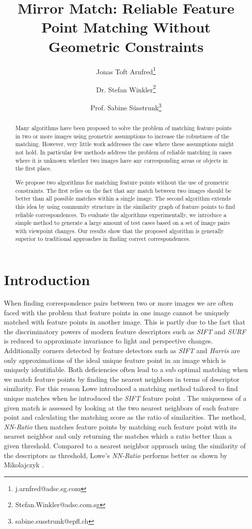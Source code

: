 \documentclass[conference]{IEEEtran}
\title{Mirror Match: Reliable Feature Point Matching Without Geometric 
Constraints}
\author[1,2]{Jonas Toft Arnfred\thanks{j.arnfred@adsc.sg.com}}
\author[1]{Dr. Stefan Winkler\thanks{Stefan.Winkler@adsc.com.sg}}
\author[2]{Prof. Sabine S\"usstrunk\thanks{sabine.susstrunk@epfl.ch}}
\affil[1]{Advanced Digital Science Center, Singapore}
\affil[2]{\'Ecole Polytechnique F\'ed\'erale de Lausanne}
\begin{document}
\maketitle
%
\begin{abstract}
Many algorithms have been proposed to solve the problem of matching 
feature points in two or more images using geometric assumptions to 
increase the robustness of the matching. However, very little work 
addresses the case where these assumptions might not hold. In particular 
few methods address the problem of reliable matching in cases where it 
is unknown whether two images have any corresponding areas or objects in 
the first place. 

We propose two algorithms for matching feature points without the use of 
geometric constraints. The first relies on the fact that any match 
between two images should be better than all possible matches within a 
single image. The second algorithm extends this idea by using community 
structure in the similarity graph of feature points to find reliable 
correspondences. To evaluate the algorithms experimentally, we introduce 
a simple method to generate a large amount of test cases based on a set 
of image pairs with viewpoint changes. Our results show that the 
proposed algorithm is generally superior to traditional approaches in 
finding correct correspondences.
\end{abstract}
%
\section{Introduction}
%
When finding correspondence pairs between two or more images we are 
often faced with the problem that feature points in one image cannot be 
uniquely matched with feature points in another image. This is partly 
due to the fact that the discriminatory powers of modern feature 
descriptors such as \emph{SIFT} \cite{lowe2004sift} and \emph{SURF} 
\cite{bay2006surf} is reduced to approximate invariance to light and 
perspective changes.  Additionally corners detected by feature detectors 
such as \emph{SIFT} and \emph{Harris} \cite{harris1988combined} are only 
approximations of the ideal unique feature point in an image which is 
uniquely identifiable.  Both deficiencies often lead to a sub optimal 
matching when we match feature points by finding the nearest neighbors 
in terms of descriptor similarity. For this reason Lowe introduced a 
matching method tailored to find unique matches when he introduced the 
\emph{SIFT} feature point \cite{lowe2004sift}. The uniqueness of a given 
match is assessed by looking at the two nearest neighbors of each 
feature point and calculating the matching score as the ratio of 
similarities. The method, \emph{NN-Ratio} then matches feature points by 
matching each feature point with its nearest neighbor and only returning 
the matches which a ratio better than a given threshold. Compared to a 
nearest neighbor approach using the similarity of the descriptors as 
threshold, Lowe's \emph{NN-Ratio} performs better as shown by 
Mikolajczyk \cite{mikolajczyk2005performance}.
\end{document}
